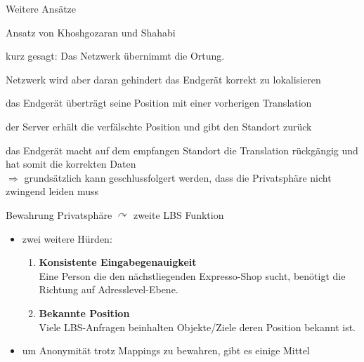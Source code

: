 \begin{frame}{Weitere Ansätze}
\itemize
  \item Ansatz von Khoshgozaran und Shahabi
  \item kurz gesagt: Das Netzwerk übernimmt die Ortung.
  \item Netzwerk wird aber daran gehindert das Endgerät korrekt zu lokalisieren
  \item das Endgerät überträgt seine Position mit einer vorherigen Translation
  \item der Server erhält die verfälschte Position und gibt den Standort zurück
  \item das Endgerät macht auf dem empfangen Standort die Translation rückgängig und hat somit die korrekten Daten\\ \vspace{.2cm}
  \hspace{-0.5cm}$\Longrightarrow$ grundsätzlich kann geschlussfolgert werden, dass die Privatsphäre nicht zwingend leiden muss
\enditemize
\end{frame}

\begin{frame}{Bewahrung Privatsphäre $\curvearrowright$ zweite LBS Funktion}
\begin{itemize}
  \item zwei weitere Hürden:
    \begin{enumerate}
      \item \textbf{Konsistente Eingabegenauigkeit} \\
      Eine Person die den nächstliegenden Expresso-Shop sucht, benötigt die Richtung auf Adresslevel-Ebene.
      \item \textbf{Bekannte Position} \\
      Viele LBS-Anfragen beinhalten Objekte/Ziele deren Position bekannt ist.
    \end{enumerate}
  \item um Anonymität trotz Mappings zu bewahren, gibt es einige Mittel
\end{itemize}
\end{frame}

